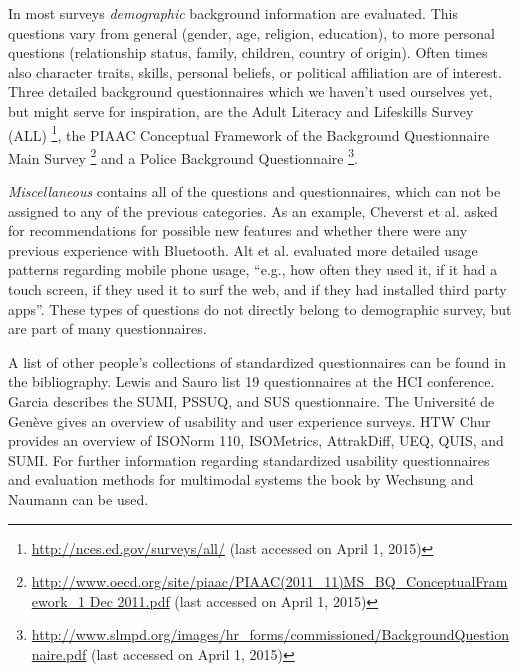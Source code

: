 
	In most surveys \textit{demographic} background information are evaluated. This questions vary from general (gender, age, religion, education), to more personal questions (relationship status, family, children, country of origin). Often times also character traits, skills, personal beliefs, or political affiliation are of interest.
	Three detailed background questionnaires which we haven't used ourselves yet, but might serve for inspiration, are the Adult Literacy and Lifeskills Survey (ALL) \footnote{\url{http://nces.ed.gov/surveys/all/} (last accessed on April 1, 2015)}, the PIAAC Conceptual Framework of the Background Questionnaire Main Survey \footnote{\url{http://www.oecd.org/site/piaac/PIAAC(2011_11)MS_BQ_ConceptualFramework_1 Dec 2011.pdf} (last accessed on April 1, 2015)} and a Police Background Questionnaire \footnote{\url{http://www.slmpd.org/images/hr_forms/commissioned/BackgroundQuestionnaire.pdf} (last accessed on April 1, 2015)}.

	\textit{Miscellaneous} contains all of the questions and questionnaires, which can not be assigned to any of the previous categories. As an example, Cheverst et al. \cite{cheverst2005hermes} asked for recommendations for possible new features and whether there were any previous experience with Bluetooth. Alt et al. \cite{alt2011digifieds} evaluated more detailed usage patterns regarding mobile phone usage, ``e.g., how often they used it, if it had a touch screen, if they used it to surf the web, and if they had installed third party apps''. These types of questions do not directly belong to demographic survey, but are part of many questionnaires.




	A list of other people's collections of standardized questionnaires can be found in the bibliography. Lewis and Sauro \cite{Lewis2013HCI} list 19 questionnaires at the HCI conference. Garcia \cite{Garcia2013UXResearch} describes the SUMI, PSSUQ, and SUS questionnaire. The Universit{\'e} de Gen{\`e}ve \cite{Geneve2014Wiki} gives an overview of usability and user experience surveys. HTW Chur \cite{Chur2014Questionnaires} provides an overview of ISONorm 110, ISOMetrics, AttrakDiff, UEQ, QUIS, and SUMI. For further information regarding standardized usability questionnaires and evaluation methods for multimodal systems the book by Wechsung and Naumann \cite{wechsung2008evaluation} can be used. 





